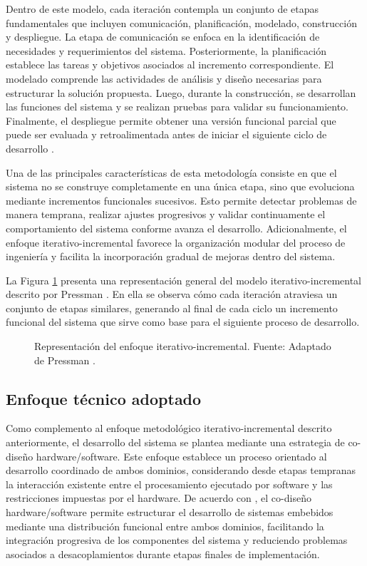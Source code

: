 Dentro de este modelo, cada iteración contempla un conjunto de etapas fundamentales que incluyen comunicación, planificación, modelado, construcción y despliegue. La etapa de comunicación se enfoca en la identificación de necesidades y requerimientos del sistema. Posteriormente, la planificación establece las tareas y objetivos asociados al incremento correspondiente. El modelado comprende las actividades de análisis y diseño necesarias para estructurar la solución propuesta. Luego, durante la construcción, se desarrollan las funciones del sistema y se realizan pruebas para validar su funcionamiento. Finalmente, el despliegue permite obtener una versión funcional parcial que puede ser evaluada y retroalimentada antes de iniciar el siguiente ciclo de desarrollo \cite{pressman2010}.

Una de las principales características de esta metodología consiste en que el sistema no se construye completamente en una única etapa, sino que evoluciona mediante incrementos funcionales sucesivos. Esto permite detectar problemas de manera temprana, realizar ajustes progresivos y validar continuamente el comportamiento del sistema conforme avanza el desarrollo. Adicionalmente, el enfoque iterativo-incremental favorece la organización modular del proceso de ingeniería y facilita la incorporación gradual de mejoras dentro del sistema.

La Figura \ref{fig:iterativo} presenta una representación general del modelo iterativo-incremental descrito por Pressman \cite{pressman2010}. En ella se observa cómo cada iteración atraviesa un conjunto de etapas similares, generando al final de cada ciclo un incremento funcional del sistema que sirve como base para el siguiente proceso de desarrollo.

\begin{figure}[H]
\centering
\resizebox{0.75\textwidth}{!}{
    \shorthandoff{<>}
    
    \shorthandon{<>}
}
\caption{Representación del enfoque iterativo-incremental. Fuente: Adaptado de Pressman \cite{pressman2010}.}
\label{fig:iterativo}
\end{figure}


\subsection{Enfoque técnico adoptado}

Como complemento al enfoque metodológico iterativo-incremental descrito anteriormente, el desarrollo del sistema se plantea mediante una estrategia de co-diseño hardware/software. Este enfoque establece un proceso orientado al desarrollo coordinado de ambos dominios, considerando desde etapas tempranas la interacción existente entre el procesamiento ejecutado por software y las restricciones impuestas por el hardware. De acuerdo con \cite{heath2002}, el co-diseño hardware/software permite estructurar el desarrollo de sistemas embebidos mediante una distribución funcional entre ambos dominios, facilitando la integración progresiva de los componentes del sistema y reduciendo problemas asociados a desacoplamientos durante etapas finales de implementación.

